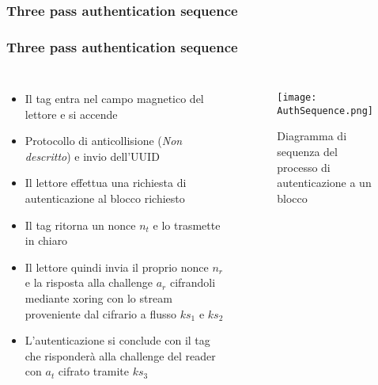 \subsubsection{Three pass authentication sequence}
\begin{frame}
    \frametitle{Three pass authentication sequence\cite{garcia2008dismantling}}
    {
        \scriptsize
        \begin{columns}[onlytextwidth,T]
            \column{\dimexpr\textwidth-40mm-2mm}
                \begin{itemize}
                    \item <1-> Il tag entra nel campo magnetico del lettore e si accende
                    \item <2-> Protocollo di anticollisione (\textit{Non descritto}) e invio dell'UUID
                    \item <3-> Il lettore effettua una richiesta di autenticazione al blocco richiesto
                    \item <4-> Il tag ritorna un nonce \(n_t\) e lo trasmette in chiaro
                    \item <5-> Il lettore quindi invia il proprio nonce \(n_r\) e la risposta alla challenge \(a_r\)
                            cifrandoli mediante xoring con lo stream proveniente dal cifrario a flusso \(ks_1\) e \(ks_2\)
                    \item <6-> L'autenticazione si conclude con il tag che risponderà alla challenge del reader con \(a_t\) cifrato tramite \(ks_3\)
                \end{itemize}
            \column{40mm}
                \begin{figure}
                    \centering
                    \texttt{[image: AuthSequence.png]}
                    \caption{\scriptsize Diagramma di sequenza del processo di autenticazione a un blocco}
                    \label{fig:seq-three-pass-auth}
                \end{figure}
        \end{columns}
    }
\end{frame}

